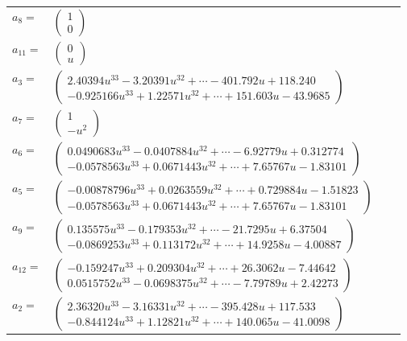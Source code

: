 \documentclass[1p]{elsarticle_modified}
\theoremstyle{definition}
\begin{document}
\begin{tabular}{m{7pt} m{180pt} m{7pt} m{180pt} }
\flushright $a_{8}=$&$\begin{pmatrix}1\\0\end{pmatrix}$ \\
\flushright $a_{11}=$&$\begin{pmatrix}0\\u\end{pmatrix}$ \\
\flushright $a_{3}=$&$\begin{pmatrix}2.40394 u^{33}-3.20391 u^{32}+\cdots-401.792 u+118.240\\-0.925166 u^{33}+1.22571 u^{32}+\cdots+151.603 u-43.9685\end{pmatrix}$ \\
\flushright $a_{7}=$&$\begin{pmatrix}1\\- u^2\end{pmatrix}$ \\
\flushright $a_{6}=$&$\begin{pmatrix}0.0490683 u^{33}-0.0407884 u^{32}+\cdots-6.92779 u+0.312774\\-0.0578563 u^{33}+0.0671443 u^{32}+\cdots+7.65767 u-1.83101\end{pmatrix}$ \\
\flushright $a_{5}=$&$\begin{pmatrix}-0.00878796 u^{33}+0.0263559 u^{32}+\cdots+0.729884 u-1.51823\\-0.0578563 u^{33}+0.0671443 u^{32}+\cdots+7.65767 u-1.83101\end{pmatrix}$ \\
\flushright $a_{9}=$&$\begin{pmatrix}0.135575 u^{33}-0.179353 u^{32}+\cdots-21.7295 u+6.37504\\-0.0869253 u^{33}+0.113172 u^{32}+\cdots+14.9258 u-4.00887\end{pmatrix}$ \\
\flushright $a_{12}=$&$\begin{pmatrix}-0.159247 u^{33}+0.209304 u^{32}+\cdots+26.3062 u-7.44642\\0.0515752 u^{33}-0.0698375 u^{32}+\cdots-7.79789 u+2.42273\end{pmatrix}$ \\
\flushright $a_{2}=$&$\begin{pmatrix}2.36320 u^{33}-3.16331 u^{32}+\cdots-395.428 u+117.533\\-0.844124 u^{33}+1.12821 u^{32}+\cdots+140.065 u-41.0098\end{pmatrix}$ \\

\end{tabular}
\end{document}

